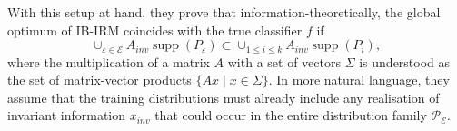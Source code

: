 With this setup at hand, they prove that information-theoretically, the global optimum of IB-IRM coincides with the true classifier $f$ if 
\begin{equation}
	\label{eq:ib-irm-support-overlap-condition}
	\cup_{\varepsilon \in \mathcal{E}}A_{inv} \operatorname{supp}(P_\varepsilon) \subset \cup_{1\leq i \leq k} A_{inv}\operatorname{supp}(P_i),
\end{equation}
where the multiplication of a matrix $A$ with a set of vectors $\Sigma$ is understood as the set of matrix-vector products $\{A x \mid x\in\Sigma\}$.
In more natural language, they assume that the training distributions must already include any realisation of invariant information $x_{inv}$ that could occur in the entire distribution family $\mathcal{P}_\mathcal{E}$.

